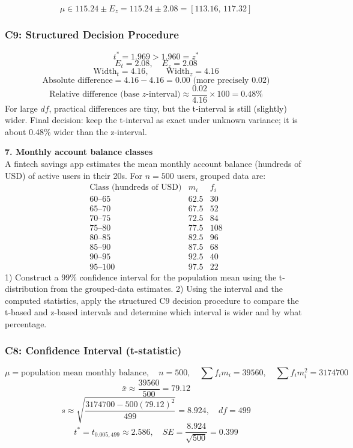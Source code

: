 \begin{ExamProblems}
		\[
		\mu\in 115.24\pm E_z=115.24\pm 2.08=[113.16,\,117.32]
		\]

		\subsubsection*{C9: Structured Decision Procedure}
		\[
		t^*=1.969>1.960=z^*
		\]
		\[
		E_t=2.08,\quad E_z=2.08
		\]
		\[
		\text{Width}_t=4.16,\qquad \text{Width}_z=4.16
		\]
		\[
		\text{Absolute difference}=4.16-4.16=0.00\text{ (more precisely }0.02\text{)}
		\]
		\[
		\text{Relative difference (base }z\text{-interval)}\approx\frac{0.02}{4.16}\times 100=0.48\%
		\]
		For large $df$, practical differences are tiny, but the t-interval is still (slightly) wider.
		Final decision: keep the t-interval as exact under unknown variance; it is about 0.48\% wider than the z-interval.

		\newpage
		\item
		\textbf{7. Monthly account balance classes}\\
		A fintech savings app estimates the mean monthly account balance (hundreds of USD) of active users in their 20s.
		For $n=500$ users, grouped data are:
		\[
		\begin{array}{c|c|c}
		\text{Class (hundreds of USD)} & m_i & f_i\\\hline
		60\text{--}65 & 62.5 & 30\\
		65\text{--}70 & 67.5 & 52\\
		70\text{--}75 & 72.5 & 84\\
		75\text{--}80 & 77.5 & 108\\
		80\text{--}85 & 82.5 & 96\\
		85\text{--}90 & 87.5 & 68\\
		90\text{--}95 & 92.5 & 40\\
		95\text{--}100 & 97.5 & 22
		\end{array}
		\]
		1) Construct a 99\% confidence interval for the population mean using the t-distribution from the grouped-data estimates.
		2) Using the interval and the computed statistics, apply the structured C9 decision procedure to compare the t-based and z-based intervals and determine which interval is wider and by what percentage.

		\subsubsection*{C8: Confidence Interval (t-statistic)}
		\[
		\mu=\text{population mean monthly balance},\quad n=500,\quad \sum f_im_i=39560,\quad \sum f_im_i^2=3174700
		\]
		\[
		\bar{x}\approx\frac{39560}{500}=79.12
		\]
		\[
		s\approx\sqrt{\frac{3174700-500(79.12)^2}{499}}=8.924,\quad df=499
		\]
		\[
		t^*=t_{0.005,499}\approx 2.586,\quad SE=\frac{8.924}{\sqrt{500}}=0.399
		\]


\end{ExamProblems}
